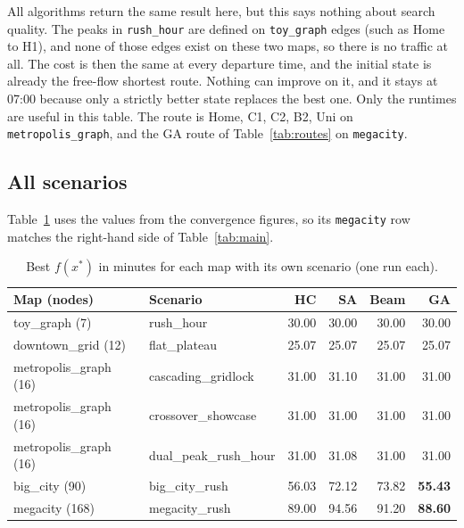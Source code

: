 \documentclass[11pt,a4paper]{article}
\newcommand{\col}[1]{\texttt{#1}}
\begin{document}
\noindent All algorithms return the same result here, but this says nothing about search quality.
The peaks in \col{rush\_hour} are defined on \col{toy\_graph} edges (such as Home to H1), and none of
those edges exist on these two maps, so there is no traffic at all. The cost is then the same at every
departure time, and the initial state is already the free-flow shortest route. Nothing can improve on
it, and it stays at 07:00 because only a strictly better state replaces the best one. Only the runtimes
are useful in this table. The route is Home, C1, C2, B2, Uni on \col{metropolis\_graph}, and the GA
route of Table~\ref{tab:routes} on \col{megacity}.

\subsection{All scenarios}

Table~\ref{tab:all} uses the values from the convergence figures, so its \col{megacity} row matches the
right-hand side of Table~\ref{tab:main}.

\begin{table}[H]
\centering
\caption{Best $f(x^*)$ in minutes for each map with its own scenario (one run each).}
\label{tab:all}
\begin{tabular}{llrrrr}
\toprule
\textbf{Map (nodes)} & \textbf{Scenario} & \textbf{HC} & \textbf{SA} & \textbf{Beam} & \textbf{GA} \\
\midrule
toy\_graph (7)         & rush\_hour            & 30.00 & 30.00 & 30.00 & 30.00 \\
downtown\_grid (12)    & flat\_plateau         & 25.07 & 25.07 & 25.07 & 25.07 \\
metropolis\_graph (16) & cascading\_gridlock   & 31.00 & 31.10 & 31.00 & 31.00 \\
metropolis\_graph (16) & crossover\_showcase   & 31.00 & 31.00 & 31.00 & 31.00 \\
metropolis\_graph (16) & dual\_peak\_rush\_hour & 31.00 & 31.08 & 31.00 & 31.00 \\
big\_city (90)         & big\_city\_rush       & 56.03 & 72.12 & 73.82 & \textbf{55.43} \\
megacity (168)         & megacity\_rush        & 89.00 & 94.56 & 91.20 & \textbf{88.60} \\
\bottomrule
\end{tabular}
\end{table}

\end{document}
